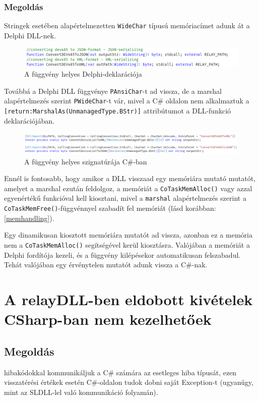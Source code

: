 \documentclass[tocnopagenum]{thesis-ekf}
\theoremstyle{definition}
\theoremstyle{remark}
\begin{document}
	\subsubsection{Megoldás}

	Stringek esetében alapértelmezetten \verb*|WideChar| típusú memóriacímet adunk át a Delphi DLL-nek.
	\begin{figure}[h!]
		\centering
		\includegraphics[scale=0.75]{string_delphi}
		\caption{A függvény helyes Delphi-deklarációja}
		\label{string_delphi}
	\end{figure}

	Továbbá a Delphi DLL függvénye \verb*|PAnsiChar|-t ad vissza, de a marshal alapértelmezés szerint \verb*|PWideChar|-t vár, mivel a C\# oldalon nem alkalmaztuk a \\\verb*|[return:MarshalAs(UnmanagedType.BStr)]| attribútumot a DLL-funkció deklarációjában.
	\begin{figure}[h!]
		\centering
		\includegraphics[scale=0.55]{string_csharp}
		\caption{A függvény helyes szignatúrája C\#-ban}
		\label{string_csharp}
	\end{figure}
	
	Ennél is fontosabb, hogy amikor a DLL visszaad egy memóriára mutató mutatót, amelyet a marshal ezután feldolgoz, a memóriát a \verb*|CoTaskMemAlloc()| vagy azzal egyenértékű funkcióval kell kiosztani, mivel a \verb*|marshal| alapértelmezés szerint a \verb*|CoTaskMemFree()|-függvénnyel szabadít fel memóriát (lásd korábban: \ref{memhandling}).
	
	Egy dinamikusan kiosztott memóriára mutatót ad vissza, azonban ez a memória nem a \verb*|CoTaskMemAlloc()| segítségével kerül kiosztásra. Valójában a memóriát a Delphi fordítója kezeli, és a függvény kilépésekor automatikusan felszabadul. Tehát valójában egy érvénytelen mutatót adunk vissza a C\#-nak.\cite{sof_strhandling}
	\section{A relayDLL-ben eldobott kivételek CSharp-ban nem kezelhetőek}
	\subsection{Megoldás} hibakódokkal kommunikáljuk a C\# számára az esetleges hiba típusát,
	ezen visszatérési értékek esetén C\#-oldalon tudok dobni saját Exception-t (ugyanúgy, mint az SLDLL-lel való kommunikáció folyamán).
\end{document}
